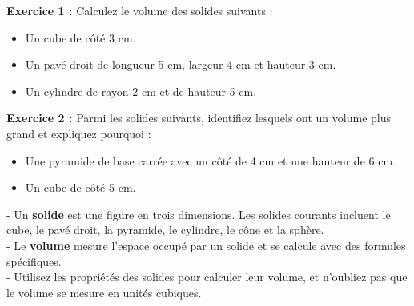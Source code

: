 \documentclass{article}
\begin{document}
\vspace{0.1cm}

\begin{tcolorbox}[colback=yellow!10!white, colframe=yellow!75!black, title=\textcolor{white}{Exercice d'application 1}, sharp corners=south]
    \textbf{Exercice 1 :} Calculez le volume des solides suivants :
    \begin{itemize}
        \item Un cube de côté 3 cm.
        \item Un pavé droit de longueur 5 cm, largeur 4 cm et hauteur 3 cm.
        \item Un cylindre de rayon 2 cm et de hauteur 5 cm.
    \end{itemize}
\end{tcolorbox}

\begin{tcolorbox}[colback=yellow!10!white, colframe=yellow!75!black, title=\textcolor{white}{Exercice d'application 2}, sharp corners=south]
    \textbf{Exercice 2 :} Parmi les solides suivants, identifiez lesquels ont un volume plus grand et expliquez pourquoi :
    \begin{itemize}
        \item Une pyramide de base carrée avec un côté de 4 cm et une hauteur de 6 cm.
        \item Un cube de côté 5 cm.
    \end{itemize}
\end{tcolorbox}

\vspace{0.1cm}

\begin{tcolorbox}[colback=cyan!10!white, colframe=cyan!75!black, title=\textcolor{white}{Récapitulatif}, sharp corners=south]
    - Un \textbf{solide} est une figure en trois dimensions. Les solides courants incluent le cube, le pavé droit, la pyramide, le cylindre, le cône et la sphère. \\
    - Le \textbf{volume} mesure l'espace occupé par un solide et se calcule avec des formules spécifiques. \\
    - Utilisez les propriétés des solides pour calculer leur volume, et n'oubliez pas que le volume se mesure en unités cubiques.
\end{tcolorbox}
\end{document}
